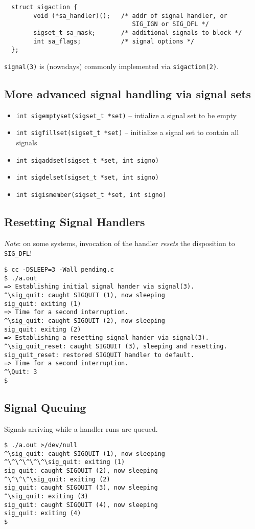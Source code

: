 \documentclass[xga]{xdvislides}
\begin{document}
\begin{verbatim}
  struct sigaction {
        void (*sa_handler)();   /* addr of signal handler, or
                                   SIG_IGN or SIG_DFL */
        sigset_t sa_mask;       /* additional signals to block */
        int sa_flags;           /* signal options */
  };
\end{verbatim}

{\tt signal(3)} is (nowadays) commonly implemented via {\tt sigaction(2)}.

\subsection{More advanced signal handling via signal sets}
\begin{itemize}
	\item {\tt int sigemptyset(sigset\_t *set)} -- intialize a signal set to be empty
	\item {\tt int sigfillset(sigset\_t *set)} -- initialize a signal set to contain all signals
	\item {\tt int sigaddset(sigset\_t *set, int signo)}
	\item {\tt int sigdelset(sigset\_t *set, int signo)}
	\item {\tt int sigismember(sigset\_t *set, int signo)}
\end{itemize}

\subsection{Resetting Signal Handlers}
{\em Note}: on some systems, invocation of the handler {\em resets} the
disposition to {\tt SIG\_DFL}!

\begin{verbatim}
$ cc -DSLEEP=3 -Wall pending.c
$ ./a.out
=> Establishing initial signal hander via signal(3).
^\sig_quit: caught SIGQUIT (1), now sleeping
sig_quit: exiting (1)
=> Time for a second interruption.
^\sig_quit: caught SIGQUIT (2), now sleeping
sig_quit: exiting (2)
=> Establishing a resetting signal hander via signal(3).
^\sig_quit_reset: caught SIGQUIT (3), sleeping and resetting.
sig_quit_reset: restored SIGQUIT handler to default.
=> Time for a second interruption.
^\Quit: 3
$
\end{verbatim}

\subsection{Signal Queuing}
Signals arriving while a handler runs are queued.
\begin{verbatim}
$ ./a.out >/dev/null
^\sig_quit: caught SIGQUIT (1), now sleeping
^\^\^\^\^\^\sig_quit: exiting (1)
sig_quit: caught SIGQUIT (2), now sleeping
^\^\^\^\sig_quit: exiting (2)
sig_quit: caught SIGQUIT (3), now sleeping
^\sig_quit: exiting (3)
sig_quit: caught SIGQUIT (4), now sleeping
sig_quit: exiting (4)
$
\end{verbatim}
\end{document}
